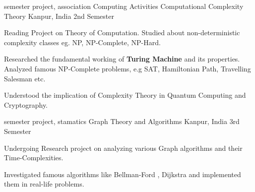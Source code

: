 


\begin{cventries}

 \cventry
    {semester project, association Computing Activities}
    {Computational Complexity Theory}
    {Kanpur, India}
    {2nd Semester}
    {
      \begin{cvitems}
        \item Reading Project on Theory of Computation. Studied about non-deterministic complexity classes eg. NP, NP-Complete, NP-Hard.
        \item Researched the fundamental working of \textbf{Turing Machine} and its properties. Analyzed famous NP-Complete problems, e.g SAT, Hamiltonian Path, Travelling Salesman etc. 
        \item Understood the implication of Complexity Theory in Quantum Computing and Cryptography. 
      \end{cvitems}
    }
    
 \cventry
    {semester project, stamatics }
    {Graph Theory and Algorithms}
    {Kanpur, India}
    {3rd Semester}
    {
      \begin{cvitems}
        \item Undergoing Research project on analyzing various Graph algorithms and their Time-Complexities.
        \item Investigated famous algorithms like Bellman-Ford , Dijkstra and implemented them in real-life problems.  
      \end{cvitems}
    }

\end{cventries}

